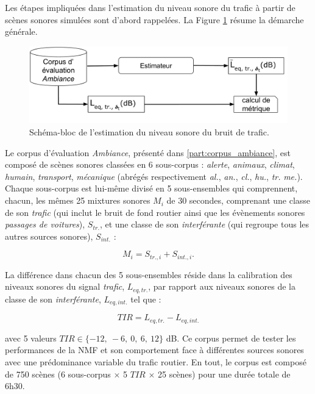 Les étapes impliquées dans l'estimation du niveau sonore du trafic à partir de scènes sonores simulées sont d'abord rappelées. La Figure \ref{fig:rappel_estimateur} résume la démarche générale.

\begin{figure}[ht]
\centering
\includegraphics[width=.8\linewidth]{./figures/NMF/Bloc_diagram_estimateur_FR.pdf}
\caption{Schéma-bloc de l'estimation du niveau sonore du bruit de trafic.}
\label{fig:rappel_estimateur}
\end{figure}

Le corpus d'évaluation \textit{Ambiance}, présenté dans \ref{part:corpus_ambiance}, est composé de scènes sonores classées en 6 sous-corpus : \textit{alerte}, \textit{animaux}, \textit{climat}, \textit{humain}, \textit{transport}, \textit{mécanique} (abrégés respectivement \textit{al.}, \textit{an.}, \textit{cl.}, \textit{hu.}, \textit{tr.} \textit{me.}). Chaque sous-corpus est lui-même divisé en 5 sous-ensembles qui comprennent, chacun, les mêmes 25 mixtures sonores $M_i$ de 30 secondes, comprenant une classe de son \textit{trafic} (qui inclut le bruit de fond routier ainsi que les évènements sonores \textit{passages de voitures}), $S_{tr.}$, et une classe de son \textit{interférante} (qui regroupe tous les autres sources sonores), $S_{int.}$ :

\begin{equation}
M_i = S_{tr.,i}+S_{int.,i}.
\end{equation}

La différence dans chacun des 5 sous-ensembles réside dans la calibration des niveaux sonores du signal \textit{trafic}, $L_{eq,tr.}$, par rapport aux niveaux sonores de la classe de son \textit{interférante}, $L_{eq,int.}$ tel que :

\begin{equation}
TIR = L_{eq,tr.} - L_{eq,int.}
\end{equation}

avec 5 valeurs $TIR \in \lbrace -12,~-6,~0,~6,~12 \rbrace$ dB. Ce corpus permet de tester les performances de la NMF et son comportement face à différentes sources sonores avec une prédominance variable du trafic routier. En tout, le corpus est composé de 750 scènes (6 sous-corpus $\times$ 5 $TIR$ $\times$ 25 scènes) pour une durée totale de 6h30.

